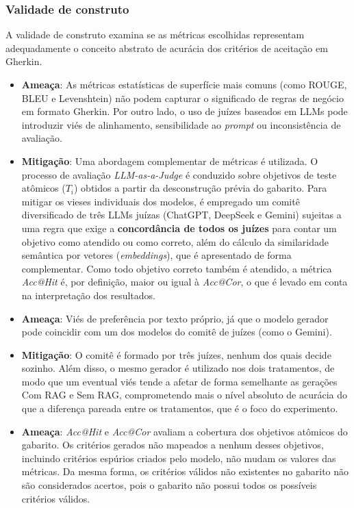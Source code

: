 \subsubsection*{Validade de construto}

A validade de construto examina se as métricas escolhidas representam adequadamente o conceito abstrato de acurácia dos critérios de aceitação em Gherkin.

\begin{itemize}
    \item \textbf{Ameaça}: As métricas estatísticas de superfície mais comuns (como ROUGE, BLEU e Levenshtein) não podem capturar o significado de regras de negócio em formato Gherkin. Por outro lado, o uso de juízes baseados em LLMs pode introduzir viés de alinhamento, sensibilidade ao \textit{prompt} ou inconsistência de avaliação.

    \item \textbf{Mitigação}: Uma abordagem complementar de métricas é utilizada. O processo de avaliação \textit{LLM-as-a-Judge} é conduzido sobre objetivos de teste atômicos ($T_i$) obtidos a partir da desconstrução prévia do gabarito. Para mitigar os vieses individuais dos modelos, é empregado um comitê diversificado de três LLMs juízas (ChatGPT, DeepSeek e Gemini) sujeitas a uma regra que exige a \textbf{concordância de todos os juízes} para contar um objetivo como atendido ou como correto, além do cálculo da similaridade semântica por vetores (\textit{embeddings}), que é apresentado de forma complementar. Como todo objetivo correto também é atendido, a métrica \textit{Acc@Hit} é, por definição, maior ou igual à \textit{Acc@Cor}, o que é levado em conta na interpretação dos resultados.

    \item \textbf{Ameaça}: Viés de preferência por texto próprio, já que o modelo gerador pode coincidir com um dos modelos do comitê de juízes (como o Gemini).

    \item \textbf{Mitigação}: O comitê é formado por três juízes, nenhum dos quais decide sozinho. Além disso, o mesmo gerador é utilizado nos dois tratamentos, de modo que um eventual viés tende a afetar de forma semelhante as gerações Com RAG e Sem RAG, comprometendo mais o nível absoluto de acurácia do que a diferença pareada entre os tratamentos, que é o foco do experimento.

    \item \textbf{Ameaça}: \textit{Acc@Hit} e \textit{Acc@Cor} avaliam a cobertura dos objetivos atômicos do gabarito. Os critérios gerados não mapeados a nenhum desses objetivos, incluindo critérios espúrios criados pelo modelo, não mudam os valores das métricas. Da mesma forma, os critérios válidos não existentes no gabarito não são considerados acertos, pois o gabarito não possui todos os possíveis critérios válidos.


\end{itemize}
